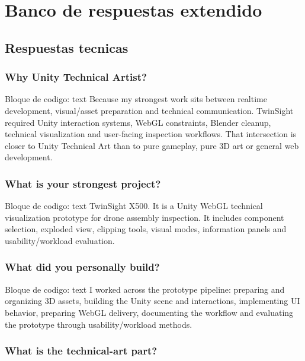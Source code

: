 \chapter{Banco de respuestas extendido}

\section{Respuestas tecnicas}


\subsection{Why Unity Technical Artist?}


\begin{mdcode}
Bloque de codigo: text
Because my strongest work sits between realtime development, visual/asset preparation and technical communication. TwinSight required Unity interaction systems, WebGL constraints, Blender cleanup, technical visualization and user-facing inspection workflows. That intersection is closer to Unity Technical Art than to pure gameplay, pure 3D art or general web development.
\end{mdcode}


\subsection{What is your strongest project?}


\begin{mdcode}
Bloque de codigo: text
TwinSight X500. It is a Unity WebGL technical visualization prototype for drone assembly inspection. It includes component selection, exploded view, clipping tools, visual modes, information panels and usability/workload evaluation.
\end{mdcode}


\subsection{What did you personally build?}


\begin{mdcode}
Bloque de codigo: text
I worked across the prototype pipeline: preparing and organizing 3D assets, building the Unity scene and interactions, implementing UI behavior, preparing WebGL delivery, documenting the workflow and evaluating the prototype through usability/workload methods.
\end{mdcode}


\subsection{What is the technical-art part?}


